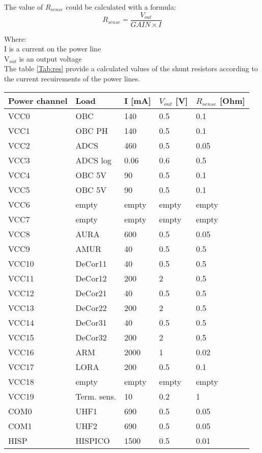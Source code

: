   The value of $R_{sense}$ could be calculated with a formula:
    \begin{equation}
    R_{sense} = \frac{V_{out}}{GAIN \times I}
    \end{equation}
  
  Where:\\
  I is a current on the power line\\
  V$_{out}$ is an output voltage\\ 
 
 The table \ref{Tab:res} provide a calculated values of the shunt resistors according to the current recuirements of the power lines.
  \newpage
  
   \begin{tabular}{p{3cm}p{3cm}p{2cm}p{2cm}p{3cm}} \toprule
   	Power channel & Load & I [mA] & $V_{out}$ [V] & $R_{sense}$ [Ohm]\\ \midrule
   VCC0 & OBC & 140 & 0.5 & 0.1\\
   VCC1 & OBC PH & 140 & 0.5 & 0.1\\
   VCC2 & ADCS & 460 & 0.5 & 0.05\\
   VCC3 & ADCS log & 0.06 & 0.6 & 0.5\\
   VCC4 & OBC 5V & 90 & 0.5 & 0.1\\
   VCC5 & OBC 5V & 90 & 0.5 & 0.1\\
   VCC6 & empty & empty & empty & empty\\
   VCC7 & empty & empty & empty & empty\\
   VCC8 & AURA & 600 & 0.5 & 0.05\\
   VCC9 & AMUR & 40 & 0.5 & 0.5\\
   VCC10 & DeCor11 & 40 & 0.5 & 0.5\\
   VCC11 & DeCor12 & 200 & 2 & 0.5\\ 
   VCC12 & DeCor21 & 40 & 0.5 & 0.5\\ 
   VCC13 & DeCor22 & 200 & 2 & 0.5\\ 
   VCC14 & DeCor31 & 40 & 0.5 & 0.5\\ 
   VCC15 & DeCor32 & 200 & 2 & 0.5\\ 
   VCC16 & ARM & 2000 & 1 & 0.02\\
   VCC17 & LORA & 200 &  0.5 & 0.1\\
   VCC18 & empty & empty & empty & empty\\
   VCC19 & Term. sens. & 10 & 0.2 & 1\\
   COM0 & UHF1 & 690 & 0.5 & 0.05\\
   COM1 & UHF2 & 690 & 0.5 & 0.05\\
   	HISP & HISPICO & 1500 & 0.5& 0.01\\ 
    \bottomrule
   	
   \end{tabular}\\ \\ \\ \\
